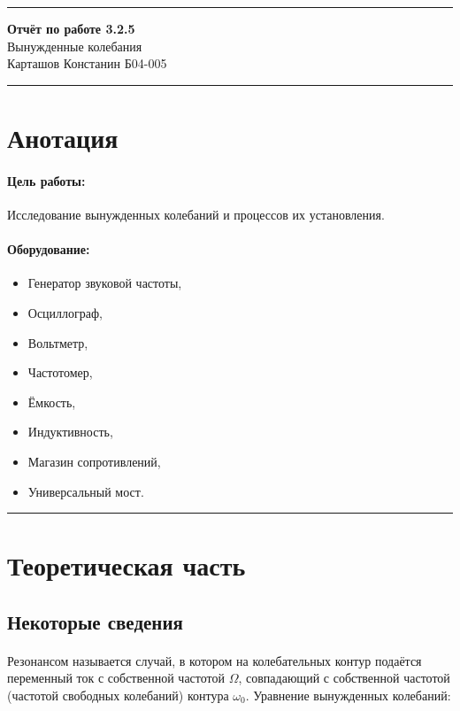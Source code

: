 \documentclass[a4paper,12pt]{article} %
\begin{document}


\hrule 	
\medskip
\begin{raggedright}
{\large \textbf{Отчёт по работе 3.2.5}}
\\
\medskip
{\Large Вынужденные колебания} 
\\
\medskip
{\large Карташов Констанин Б04-005}
\medskip
\hrule
\medskip
\end{raggedright}


\section{Анотация}

\paragraph{Цель работы:} 
Исследование вынужденных колебаний и процессов их установления.

\paragraph{Оборудование:}
\begin{itemize}
\renewcommand{\labelitemi}{$\triangleright$}
\itemsep0em
\item Генератор звуковой частоты,
\item Осциллограф,
\item Вольтметр,
\item Частотомер,
\item Ёмкость,
\item Индуктивность,
\item Магазин сопротивлений,
\item Универсальный мост.
\end{itemize}


\medskip\hrule\medskip

\section{Теоретическая часть}

\subsection{Некоторые сведения}

\paragraph{} Резонансом называется случай, в котором на колебательных контур подаётся переменный ток с собственной частотой $\Omega$, совпадающий с собственной частотой (частотой свободных колебаний) контура $\omega_0$. Уравнение вынужденных колебаний:
\end{document}
